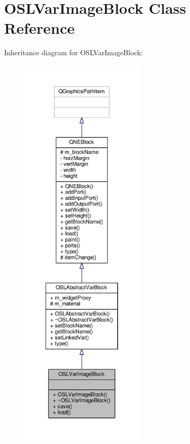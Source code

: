 \hypertarget{class_o_s_l_var_image_block}{\section{O\-S\-L\-Var\-Image\-Block Class Reference}
\label{class_o_s_l_var_image_block}
}


Inheritance diagram for O\-S\-L\-Var\-Image\-Block\-:
\nopagebreak
\begin{figure}[H]
\begin{center}
\leavevmode
\includegraphics[height=550pt]{class_o_s_l_var_image_block__inherit__graph}
\end{center}
\end{figure}


